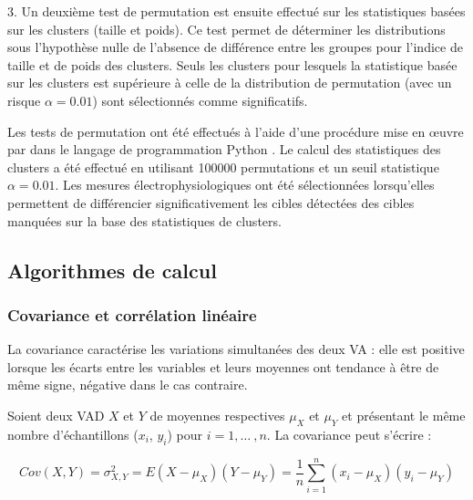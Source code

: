 3. Un deuxième test de permutation est ensuite effectué sur les statistiques basées sur les clusters (taille et poids). 
Ce test permet de déterminer les distributions sous l'hypothèse nulle de l'absence de différence entre les groupes pour l'indice de taille et de poids des clusters. 
Seuls les clusters pour lesquels la statistique basée sur les clusters est supérieure à celle de la distribution de permutation (avec un risque $\alpha=0.01$) sont sélectionnés comme significatifs. 

Les tests de permutation ont été effectués à l'aide d'une procédure mise en œuvre par \cite{lenne2013decrease} dans le langage de programmation Python \citep{van2007python}. 
Le calcul des statistiques des clusters a été effectué en utilisant 100000 permutations et un seuil statistique $\alpha=0.01$. 
Les mesures électrophysiologiques ont été sélectionnées lorsqu'elles permettent de différencier significativement les cibles détectées des cibles manquées sur la base des statistiques de clusters. 

\subsection{Algorithmes de calcul}
\label{algocalculindicetransmissiondinfo}

\subsubsection*{Covariance et corrélation linéaire}
\label{algocalculindicecovcor}

La covariance caractérise les variations simultanées des deux VA : elle est positive lorsque les écarts entre les variables et leurs moyennes ont tendance à être de même signe, négative dans le cas contraire. 

Soient deux VAD $X$ et $Y$ de moyennes respectives $\mu_X$ et $\mu_Y$ et présentant le même nombre d'échantillons ($x_i$, $y_i$) pour $i=1,\ldots~,n$. 
La covariance peut s'écrire : 

\begin{equation}
Cov(X,Y) = \sigma_{X,Y}^2 = E(X - \mu_X)(Y - \mu_Y ) = \frac{1}{n} \sum_{i=1}^n(x_i - \mu_X)(y_i - \mu_Y )
\end{equation}

